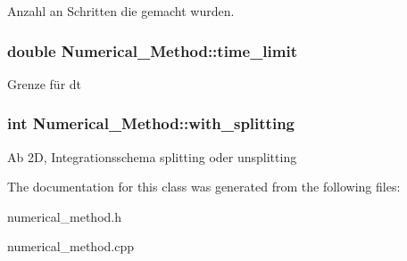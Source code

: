 Anzahl an Schritten die gemacht wurden. \hypertarget{classNumerical__Method_a2edf6c77c3d30d1250e0410de12f5cc5}{
\subsubsection[{time\-\_\-limit}]{\setlength{\rightskip}{0pt plus 5cm}double Numerical\-\_\-\-Method\-::time\-\_\-limit}}\label{classNumerical__Method_a2edf6c77c3d30d1250e0410de12f5cc5}
Grenze für dt \hypertarget{classNumerical__Method_a1a565e278873462880e6abb92660c3cb}{
\subsubsection[{with\-\_\-splitting}]{\setlength{\rightskip}{0pt plus 5cm}int Numerical\-\_\-\-Method\-::with\-\_\-splitting}}\label{classNumerical__Method_a1a565e278873462880e6abb92660c3cb}
Ab 2\-D, Integrationsschema splitting oder unsplitting 

The documentation for this class was generated from the following files\-:\begin{DoxyCompactItemize}
\item 
numerical\-\_\-method.\-h\item 
numerical\-\_\-method.\-cpp\end{DoxyCompactItemize}
